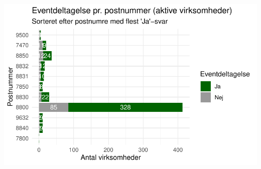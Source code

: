 \documentclass[
  11pt,
  letterpaper,
  DIV=11,
  numbers=noendperiod]{scrartcl}
\begin{document}
\includegraphics{Quarto_files/figure-pdf/unnamed-chunk-6-5.pdf}
\end{document}

